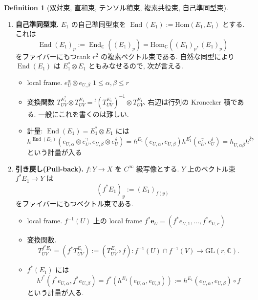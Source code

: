 \documentclass[dvipdfmx,a4paper,11pt]{article} %
\theoremstyle{definition}
\newtheorem{defn}[thm]{Definition}
\theoremstyle{remark}
\numberwithin{equation}{section}
\newcommand{\End}[0]{\operatorname{End}}
\newcommand{\C}{\mathbb{C}}
\begin{document}
\begin{defn}[双対束, 直和束, テンソル積束, 複素共役束, 自己準同型束]
\begin{enumerate}
\begin{itemize}
\item local frame. \(\overline{\mathbf{e}}_U=(\overline{e}_{U,1},\ldots,\overline{e}_{U,r})\)
\item 変換関数 \(T^{\overline{E_1}}_{UV}=\overline{T^{E_1}_{UV}}\) で, 変換則は
\[
\overline{\mathbf{e}}_V=\overline{\mathbf{e}}_U\,\overline{T^{E_1}_{UV}}.
\]
\item  \(\overline{E_1}\) には
\[
h^{\overline{E_1}}(\overline{e}_{U,\alpha}, \overline{e}_{U,\beta})
=\overline{h_{U,\alpha\overline{\beta}}}=h_{U,\beta\overline{\alpha}}
\]
という計量が入る. 
\end{itemize}
\item \textbf{自己準同型束.} \(E_1\) の自己準同型束を
\(
\End(E_1):=\mathrm{Hom}(E_1,E_1)
\)
とする. これは
\[
\End(E_1)_p:=\End_{\mathbb{C}}((E_1)_p)=\mathrm{Hom}_{\mathbb{C}}((E_1)_p,(E_1)_p)
\]
をファイバーにもつrank \(r^2\) の複素ベクトル束である. 自然な同型により \(\End(E_1)\) は \(E_1^*\otimes E_1\) ともみなせるので, 次が言える.
\begin{itemize}
\item local frame. \(e_U^\alpha\otimes e_{U,\beta}\) \( 1\leq \alpha,\beta\leq r\)
\item 変換関数 \(T^{E_1^*}_{UV}\otimes T^{E_1}_{UV}={}^t(T^{E_1}_{UV})^{-1} \otimes T^{E_1}_{UV}\). 右辺は行列の Kronecker 積である. 一般にこれを書くのは難しい.
\item 計量: \(\End(E_1)=E_1^{*} \otimes E_1\) には
\[
h^{\End (E_1)}(e_{U,\alpha}\otimes e_U^\gamma, e_{U,\beta}\otimes e_U^\delta)
= h^{E_1}(e_{U,\alpha},  e_{U,\beta})h^{E_1^*}( e_U^\gamma,  e_U^\delta)
=h_{U,\alpha\overline{\beta}}h^{\overline{\delta}\gamma}
\]
という計量が入る
\end{itemize}

\item \textbf{引き戻し(Pull-back).} \(f : Y \to X\) を \(C^\infty\) 級写像とする. \(Y\) 上のベクトル束 \(f^{*}E_1 \to Y\) は
\[
(f^*E_1)_y:=(E_1)_{f(y)}
\]
をファイバーにもつベクトル束である.
\begin{itemize}
\item local frame. \(f^{-1}(U)\) 上の local frame
\(
f^{*}\mathbf{e}_U=
(f^{*}e_{U, 1}, \ldots, f^{*}e_{U, r})
\)
\item 変換関数.
\[
T^{f^{*} E_1}_{UV}=(f^{*}T^{E_1}_{UV})
:=(T^{E_1}_{UV}\circ f) : 
f^{-1}(U) \cap f^{-1}(V)
\to \mathrm{GL}(r, \C).
\]
\item \(f^*(E_1)\) には
\[
h^{f^{*}}(f^{*}e_{U,\alpha},  f^{*}e_{U,\beta})
= f^{*}(h^{E_1}(e_{U,\alpha},  e_{U,\beta})) 
:=h^{E_1}(e_{U,\alpha},  e_{U,\beta}) \circ f
\]
という計量が入る.
\end{itemize}
\end{enumerate}
\end{defn}
\end{document}

